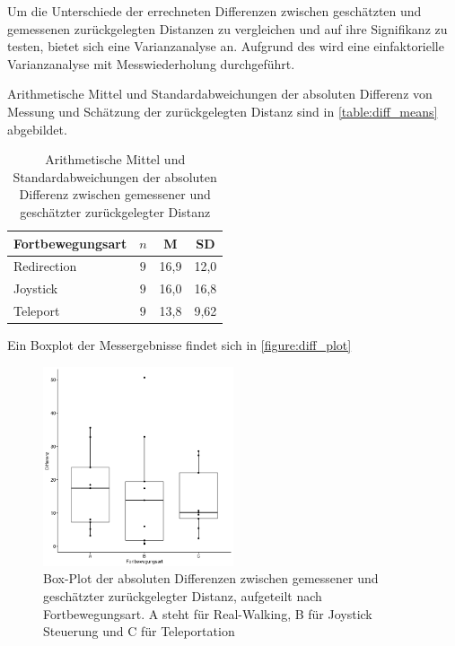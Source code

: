                     Um die Unterschiede der errechneten Differenzen zwischen geschätzten und gemessenen zurückgelegten Distanzen zu vergleichen und auf ihre Signifikanz zu testen, bietet sich eine Varianzanalyse an.
                    Aufgrund des  wird eine einfaktorielle Varianzanalyse mit Messwiederholung durchgeführt.

                    Arithmetische Mittel und Standardabweichungen der absoluten Differenz von Messung und Schätzung der zurückgelegten Distanz sind in \autoref{table:diff_means} abgebildet.

                    \begin{table}[!h]
                        \renewcommand\arraystretch{1.2}
                        \centering
                        \begin{tabular}{lccc} \toprule
                            Fortbewegungsart& $n$ & M    & SD   \\ \midrule
                            Redirection     & $9$ & 16,9 & 12,0 \\
                            Joystick        & $9$ & 16,0 & 16,8 \\
                            Teleport        & $9$ & 13,8 & 9,62 \\ \bottomrule
                        \end{tabular}
                        \caption{Arithmetische Mittel und Standardabweichungen der absoluten Differenz zwischen gemessener und geschätzter zurückgelegter Distanz}\label{table:diff_means}
                    \end{table}

                    Ein Boxplot der Messergebnisse findet sich in \autoref{figure:diff_plot}

                    \begin{figure}[!h]
                        \centering
                        \includegraphics[width=0.5\textwidth]{plots/diff_plot.png}
                        \caption{Box-Plot der absoluten Differenzen zwischen gemessener und geschätzter zurückgelegter Distanz, aufgeteilt nach Fortbewegungsart. A steht für Real-Walking, B für Joystick Steuerung und C für Teleportation}\label{figure:diff_plot}
                    \end{figure}

